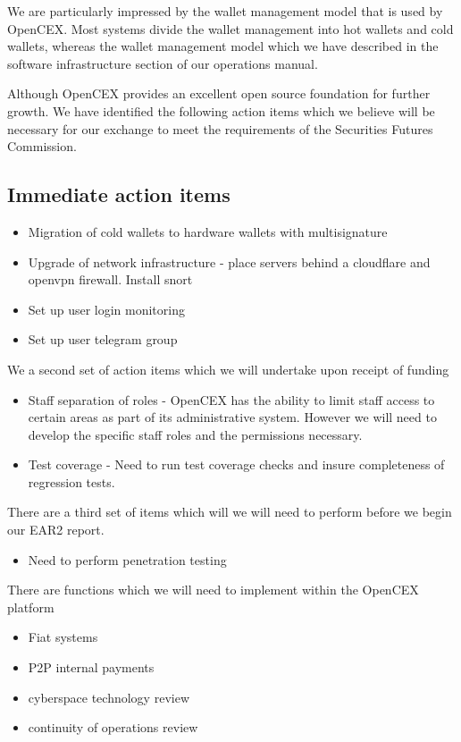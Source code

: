 \documentclass[]{report}
\begin{document}
We are particularly impressed by the wallet management model that is
used by OpenCEX.  Most systems divide the wallet management into hot
wallets and cold wallets, whereas the wallet management model which we
have described in the software infrastructure section of our
operations manual.

Although OpenCEX provides an excellent open source foundation for
further growth.  We have identified the following action items which
we believe will be necessary for our exchange to meet the requirements
of the Securities Futures Commission.

\subsection{Immediate action items}

\begin{itemize}
\item Migration of cold wallets to hardware wallets with multisignature

\item Upgrade of network infrastructure - place servers behind a cloudflare and
openvpn firewall.  Install snort

\item Set up user login monitoring

\item Set up user telegram group
\end{itemize}

We a second set of action items which we will undertake upon receipt
of funding

\begin{itemize}

\item Staff separation of roles - OpenCEX has the ability to limit
  staff access to certain areas as part of its administrative system.
  However we will need to develop the specific staff roles and the
  permissions necessary.

\item Test coverage - Need to run test coverage checks and insure
  completeness of regression tests.

\end{itemize}

There are a third set of items which will we will need to perform
before we begin our EAR2 report.

\begin{itemize}
\item Need to perform penetration testing
\end{itemize}

There are functions which we will need to implement within the
OpenCEX platform
\begin{itemize}
\item Fiat systems
\item P2P internal payments
\end{itemize}


\begin{itemize}
\item cyberspace technology review
\item continuity of operations review
\end{itemize}
\end{document}
